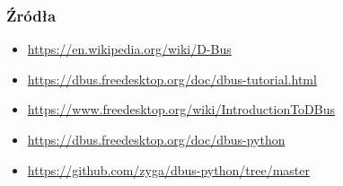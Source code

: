 


\begin{frame}
    \frametitle{Źródła}
    \begin{itemize}
        \item     \href{https://en.wikipedia.org/wiki/D-Bus}{https://en.wikipedia.org/wiki/D-Bus}
        \item     \href{https://dbus.freedesktop.org/doc/dbus-tutorial.html}{https://dbus.freedesktop.org/doc/dbus-tutorial.html}
        \item     \href{https://www.freedesktop.org/wiki/IntroductionToDBus/}{https://www.freedesktop.org/wiki/IntroductionToDBus}
        \item     \href{https://dbus.freedesktop.org/doc/dbus-python/}{https://dbus.freedesktop.org/doc/dbus-python}
        \item     \href{https://github.com/zyga/dbus-python/tree/master}{https://github.com/zyga/dbus-python/tree/master}
    \end{itemize}
\end{frame}
